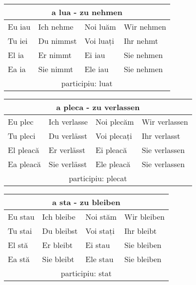 \documentclass[11pt, oneside]{article}
\begin{document}
%
\begin{center}
  \begin{tabular}{ |p{3.25cm}|p{3.25cm}||p{3.25cm}|p{3.25cm}| }
      \hline
      \multicolumn{4}{|c|}{a lua - zu nehmen} \\
      \hline
      \hline
      Eu iau & Ich nehme & Noi luăm & Wir nehmen\\
      \hline
      Tu iei & Du nimmst & Voi luați & Ihr nehmt\\
      \hline
      El ia & Er nimmt & Ei iau & Sie nehmen\\ 
      Ea ia & Sie nimmt & Ele iau & Sie nehmen\\
      \hline
      \multicolumn{4}{|c|}{participiu: luat} \\
      \hline
     \end{tabular}
\end{center}
%
\begin{center}
  \begin{tabular}{ |p{3.25cm}|p{3.25cm}||p{3.25cm}|p{3.25cm}| }
      \hline
      \multicolumn{4}{|c|}{a pleca - zu verlassen} \\
      \hline
      \hline
      Eu plec & Ich verlasse & Noi plecăm & Wir verlassen\\
      \hline
      Tu pleci & Du verlässt & Voi plecați & Ihr verlasst\\
      \hline
      El pleacă & Er verlässt & Ei pleacă & Sie verlassen\\ 
      Ea pleacă & Sie verlässt & Ele pleacă & Sie verlassen\\
      \hline
      \multicolumn{4}{|c|}{participiu: plecat} \\
      \hline
     \end{tabular}
\end{center}
%
\begin{center}
  \begin{tabular}{ |p{3.25cm}|p{3.25cm}||p{3.25cm}|p{3.25cm}| }
      \hline
      \multicolumn{4}{|c|}{a sta - zu bleiben} \\
      \hline
      \hline
      Eu stau & Ich bleibe & Noi stăm & Wir bleiben\\
      \hline
      Tu stai & Du bleibst & Voi stați & Ihr bleibt\\
      \hline
      El stă & Er bleibt & Ei stau & Sie bleiben\\ 
      Ea stă & Sie bleibt & Ele stau & Sie bleiben\\
      \hline
      \multicolumn{4}{|c|}{participiu: stat} \\
      \hline
     \end{tabular}
\end{center}
\end{document}
